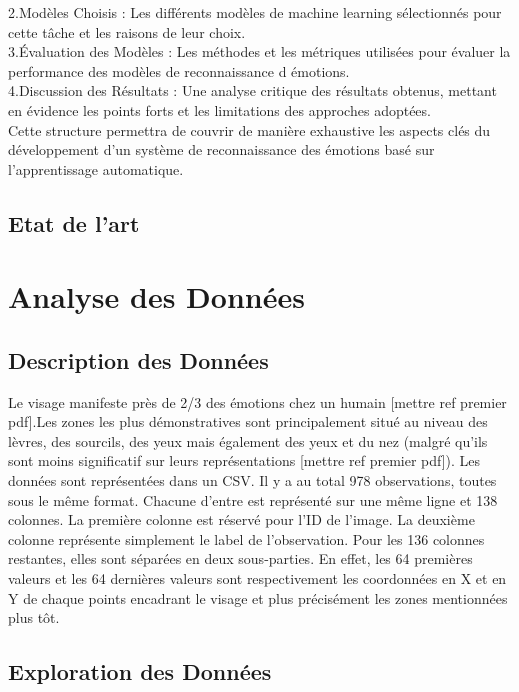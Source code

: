 \documentclass{rapport}
\begin{document}
2.Modèles Choisis : 
Les différents modèles de machine learning sélectionnés pour cette tâche et les raisons de leur choix.\\

3.Évaluation des Modèles :
Les méthodes et les métriques utilisées pour évaluer la performance des modèles de reconnaissance d émotions.\\

4.Discussion des Résultats : 
Une analyse critique des résultats obtenus, mettant en évidence les points forts et les limitations des approches adoptées.\\

Cette structure permettra de couvrir de manière exhaustive les aspects clés du développement d'un système de reconnaissance des émotions basé sur l'apprentissage automatique.

\subsection{Etat de l'art}

\section{Analyse des Données}
\subsection{Description des Données}

Le visage manifeste près de 2/3 des émotions chez un humain 
[mettre ref premier pdf].Les zones les plus démonstratives sont 
principalement situé au niveau des lèvres, des sourcils, des yeux mais 
également des yeux et du nez (malgré qu'ils sont moins significatif sur leurs
représentations [mettre ref premier pdf]). Les données sont représentées dans 
un CSV. Il y a au total 978 observations, toutes sous le même format. Chacune 
d'entre est représenté sur une même ligne et 138 colonnes. La première colonne 
est réservé pour l'ID de l'image. La deuxième colonne représente simplement le 
label de l'observation. Pour les 136 colonnes restantes, elles sont séparées 
en deux sous-parties. En effet, les 64 premières valeurs et les 64 dernières 
valeurs sont respectivement les coordonnées en X et en Y de chaque points 
encadrant le visage et plus précisément les zones mentionnées plus tôt.

\subsection{Exploration des Données}
\end{document}
